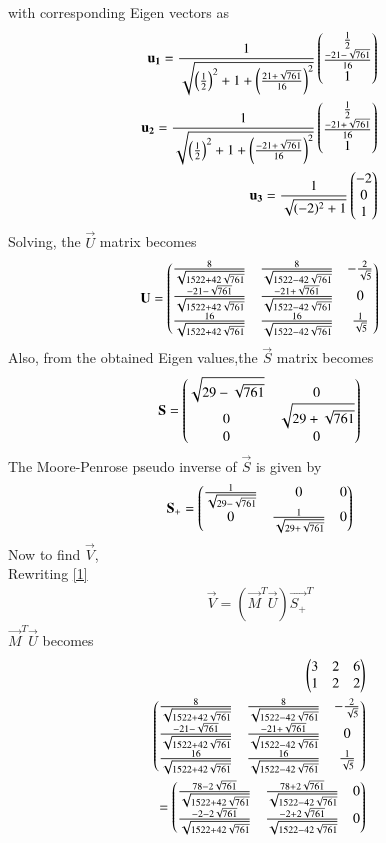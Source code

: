 \documentclass[journal,12pt,twocolumn]{IEEEtran}
\begin{document}
with corresponding Eigen vectors as 
\begin{align}
\mathbf{u_1}=\frac{1}{\sqrt{\left(\frac{1}{2}\right)^2+1+\left(\frac{21+\sqrt{761}}{16}\right)^2}}\begin{pmatrix}\frac{1}{2}\\\frac{-21-\sqrt{761}}{16}\\1\end{pmatrix}\\
\mathbf{u_2}=\frac{1}{\sqrt{\left(\frac{1}{2}\right)^2+1+\left(\frac{-21+\sqrt{761}}{16}\right)^2}}\begin{pmatrix}\frac{1}{2}\\\frac{-21+\sqrt{761}}{16}\\1\end{pmatrix}\\
\mathbf{u_3}=\frac{1}{\sqrt{(-2)^2+1}}\begin{pmatrix}-2\\0\\1\end{pmatrix}
\end{align}
Solving, the $\vec{U}$ matrix becomes
\begin{align}
    \mathbf{U}=\begin{pmatrix}\frac{8}{\sqrt{1522+42\sqrt{761}}}&\frac{8}{\sqrt{1522-42\sqrt{761}}}&-\frac{2}{\sqrt{5}}\\\frac{-21-\sqrt{761}}{\sqrt{1522+42\sqrt{761}}}&\frac{-21+\sqrt{761}}{\sqrt{1522-42\sqrt{761}}}&0\\\frac{16}{\sqrt{1522+42\sqrt{761}}}&\frac{16}{\sqrt{1522-42\sqrt{761}}}&\frac{1}{\sqrt{5}}\end{pmatrix}
\end{align}
Also, from the obtained Eigen values,the $\vec{S}$ matrix becomes
\begin{align}
    \mathbf{S}=\begin{pmatrix}\sqrt{29-\sqrt{761}}&0\\0&\sqrt{29+\sqrt{761}}\\0&0\end{pmatrix}
\end{align}
The Moore-Penrose pseudo inverse of $\vec{S}$ is given by
\begin{align}
    \mathbf{S}_+=\begin{pmatrix}\frac{1}{\sqrt{29-\sqrt{761}}}&0&0\\0&\frac{1}{\sqrt{29+\sqrt{761}}}&0\end{pmatrix}\label{2}
\end{align}
Now to find $\vec{V}$,\\
Rewriting \eqref{1}
\begin{align}
    \vec{V}=(\vec{M}^T\vec{U})\vec{S_+}^T\label{3}
    \end{align}
    $ \vec{M}^T\vec{U}$ becomes
    \begin{align}
   \begin{pmatrix}3&2&6\\1&2&2\end{pmatrix}\\\begin{pmatrix}\frac{8}{\sqrt{1522+42\sqrt{761}}}&\frac{8}{\sqrt{1522-42\sqrt{761}}}&-\frac{2}{\sqrt{5}}\\\frac{-21-\sqrt{761}}{\sqrt{1522+42\sqrt{761}}}&\frac{-21+\sqrt{761}}{\sqrt{1522-42\sqrt{761}}}&0\\\frac{16}{\sqrt{1522+42\sqrt{761}}}&\frac{16}{\sqrt{1522-42\sqrt{761}}}&\frac{1}{\sqrt{5}}\end{pmatrix}\\
   =\begin{pmatrix}\frac{78-2\sqrt{761}}{\sqrt{1522+42\sqrt{761}}}&\frac{78+2\sqrt{761}}{\sqrt{1522-42\sqrt{761}}}&0\\\frac{-2-2\sqrt{761}}{\sqrt{1522+42\sqrt{761}}}&\frac{-2+2\sqrt{761}}{\sqrt{1522-42\sqrt{761}}}&0\end{pmatrix}\label{4}
\end{align}
\end{document}
